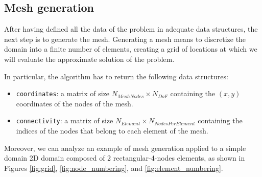 \subsection{Mesh generation}
\label{sec:mesh_generation}

After having defined all the data of the problem in adequate data structures, the next step is to generate the mesh.
Generating a mesh means to discretize the domain into a finite number of elements, creating a grid of locations at which we will evaluate the approximate solution of the problem.

In particular, the algorithm has to return the following data structures:

\begin{itemize}
    \item \texttt{coordinates}: a matrix of size $N_{MeshNodes} \times N_{DoF}$ containing the $(x, y)$ coordinates of the nodes of the mesh.
    \item \texttt{connectivity}: a matrix of size $N_{Element} \times N_{NodesPerElement}$ containing the indices of the nodes that belong to each element of the mesh.
\end{itemize}

Moreover, we can analyze an example of mesh generation applied to a simple domain 2D domain composed of 2 rectangular-4-nodes elements, as shown in Figures \ref{fig:grid}, \ref{fig:node_numbering}, and \ref{fig:element_numbering}.

